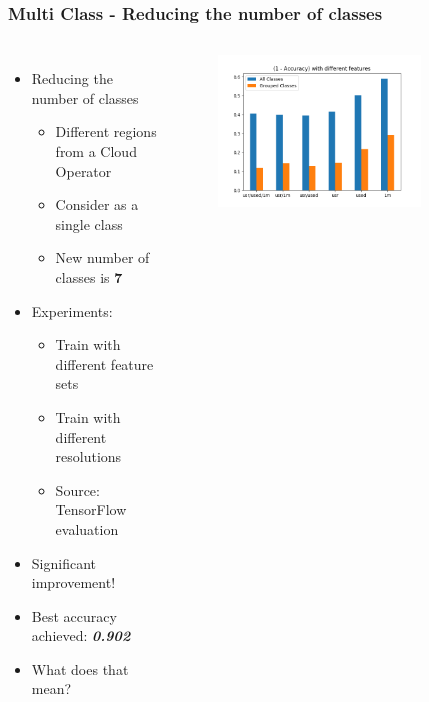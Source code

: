 \documentclass[aspectratio=169,11pt,hyperref={colorlinks=true}]{beamer}
\begin{document}
\begin{frame}
    \frametitle{Multi Class - Reducing the number of classes}
    \begin{columns}
        \begin{itemize}
            \item{Reducing the number of classes}
            \begin{itemize}
                \item{Different regions from a Cloud Operator}
                \item{Consider as a single class}
                \item{New number of classes is \textbf{7}}
            \end{itemize}
            \item{Experiments:}
              \begin{itemize}
                \item{Train with different feature sets}
                \item{Train with different resolutions}
                \item{Source: TensorFlow evaluation}
            \end{itemize}
            \item{Significant improvement!}
            \item{Best accuracy achieved: \emph{\textbf{0.902}}}
            \item{What does that mean?}
        \end{itemize}
        \begin{center}
        \begin{figure}
          \includegraphics[width=0.8\textwidth,height=0.4\textheight]{graphs/accuracy_by_feature-compare-classes.png}

\end{figure}
\end{center}
\end{columns}
\end{frame}
\end{document}
